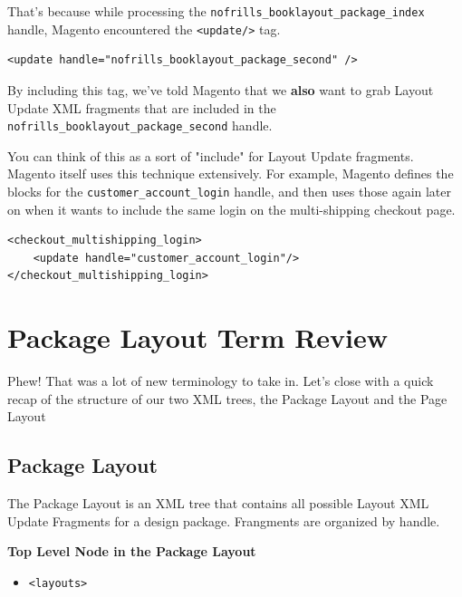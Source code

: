 \documentclass[oneside]{book}
\begin{document}
That's because while processing the \footnotesize\texttt{nofrills\_booklayout\_package\_index} \normalsize  handle, Magento encountered the \footnotesize\texttt{\textless update/\textgreater } \normalsize  tag.

\begin{lstlisting}
<update handle="nofrills_booklayout_package_second" />

\end{lstlisting}


By including this tag, we've told Magento that we \textbf{also} want to grab Layout Update XML fragments that are included in the \footnotesize\texttt{nofrills\_booklayout\_package\_second} \normalsize  handle.

You can think of this as a sort of "include" for Layout Update fragments. Magento itself uses this technique extensively.  For example, Magento defines the blocks for the \footnotesize\texttt{customer\_account\_login} \normalsize  handle, and then uses those again later on when it wants to include the same login on the multi-shipping checkout page.

\begin{lstlisting}
<checkout_multishipping_login>
    <update handle="customer_account_login"/>
</checkout_multishipping_login>

\end{lstlisting}


\section{Package Layout Term Review}

Phew!  That was a lot of new terminology to take in.  Let's close with a quick recap of the structure of our two XML trees, the Package Layout and the Page Layout

\subsection{Package Layout}

The Package Layout is an XML tree that contains all possible Layout XML Update Fragments for a design package.  Frangments are organized by handle.

\textbf{Top Level Node in the Package Layout}

\begin{itemize}
\item \footnotesize\texttt{\textless layouts\textgreater } \normalsize
\end{itemize}
\end{document}
